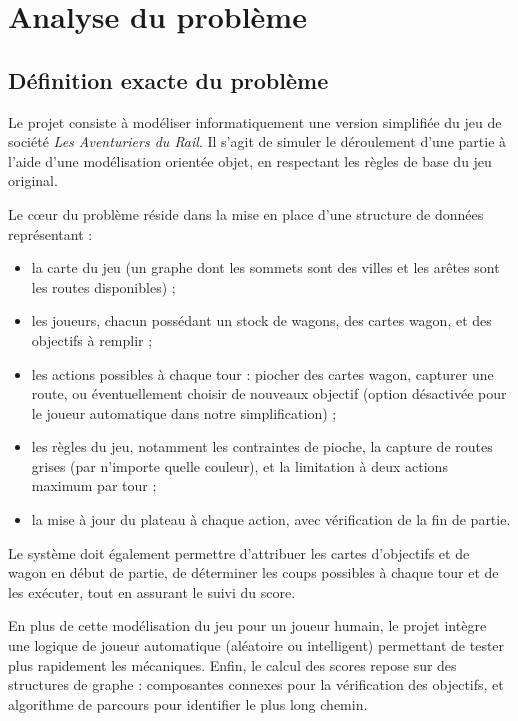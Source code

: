 \documentclass[a4paper,12pt]{report}
\begin{document}
\chapter{Analyse du problème}

\section{Définition exacte du problème}

Le projet consiste à modéliser informatiquement une version simplifiée du jeu de société \textit{Les Aventuriers du Rail}.
Il s'agit de simuler le déroulement d'une partie à l'aide d'une modélisation orientée objet, en respectant les règles de base du jeu original.

Le cœur du problème réside dans la mise en place d'une structure de données représentant :
\begin{itemize}
    \item la carte du jeu (un graphe dont les sommets sont des villes et les arêtes sont les routes disponibles) ;
    \item les joueurs, chacun possédant un stock de wagons, des cartes wagon, et des objectifs à remplir ;
    \item les actions possibles à chaque tour : piocher des cartes wagon, capturer une route, ou éventuellement choisir
    de nouveaux objectif (option désactivée pour le joueur automatique dans notre simplification) ;
    \item les règles du jeu, notamment les contraintes de pioche, la capture de routes grises
    (par n'importe quelle couleur), et la limitation à deux actions maximum par tour ;
    \item la mise à jour du plateau à chaque action, avec vérification de la fin de partie.
\end{itemize}

Le système doit également permettre d’attribuer les cartes d’objectifs et de wagon en début de partie,
de déterminer les coups possibles à chaque tour et de les exécuter, tout en assurant le suivi du score.

En plus de cette modélisation du jeu pour un joueur humain, le projet intègre une logique de joueur automatique
(aléatoire ou intelligent) permettant de tester plus rapidement les mécaniques.
Enfin, le calcul des scores repose sur des structures de graphe : composantes connexes pour la vérification des objectifs,
et algorithme de parcours pour identifier le plus long chemin.
\end{document}
